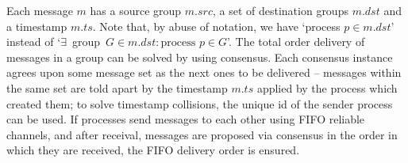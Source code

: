 \documentclass[times, 10pt]{article}
\begin{document}

Each message $m$ has a source group $m.src$, a set of destination groups $m.dst$ and a timestamp $m.ts$. Note that, by abuse of notation, we have `process \mbox{$p \in m.dst$'} instead of `\mbox{$\exists$ group $G \in m.dst : \text{process }p \in G$'}. The total order delivery of messages in a group can be solved by using consensus. Each consensus instance agrees upon some message set as the next ones to be delivered -- messages within the same set are told apart by the timestamp $m.ts$ applied by the process which created them; to solve timestamp collisions, the unique id of the sender process can be used. If processes send messages to each other using FIFO reliable channels, and after receival, messages are proposed via consensus in the order in which they are received, the FIFO delivery order is ensured.
\end{document}
